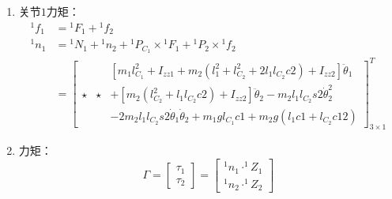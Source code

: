 \documentclass[
12pt, %
a4paper, 
oneside, %
headinclude,footinclude, %
]{scrartcl}
\begin{document}
{\begin{enumerate}
\begin{align*}
{}^1 n_2 &= {}^1 N_2 + {}^1 P_{C_2} \times {}^1 F_2 = \begin{bmatrix} 0 & 0 & (I_{zz2} + m_2l_{C_2}^2)(\ddot{\theta}_1 + \ddot{\theta}_2) + m_2 l_1 l_{C_2}c2 \ddot{\theta}_1 - m_2 l_1 l_{C_2}s2 \dot{\theta}_1^2 + m_2 g l_{C_2}c12 \end{bmatrix}^T
\end{align*}
\item 关节$ 1 $力矩：
\begin{align*}
{}^1 f_1 &= {}^1 F_1 + {}^1 f_2 \\
{}^1 n_1 &= {}^1 N_1 + {}^1 n_2 + {}^1 P_{C_1} \times {}^1 F_1 + {}^1 P_2 \times {}^1 f_2 \\
&= \begin{bmatrix} 
& & [m_1 l_{C_1}^2 + I_{zz1} + m_2(l_1^2 + l_{C_2}^2 + 2l_1 l_{C_2}c2) + I_{zz2}]\ddot{\theta}_1 \\
\star & \star & + [m_2(l_{C_2}^2 + l_1 l_{C_2}c2) + I_{zz2}]\ddot{\theta}_2 - m_2 l_1 l_{C_2}s2 \dot{\theta}_2^2 \\
& & - 2m_2 l_1 l_{C_2}s2 \dot{\theta}_1 \dot{\theta}_2 + m_1 g l_{C_1}c1 + m_2 g(l_1 c1 + l_{C_2}c12) 
\end{bmatrix}^T_{3 \times 1}
\end{align*}
\item 力矩：
$$ \Gamma = \begin{bmatrix} \tau_1 \\ \tau_2 \end{bmatrix} = \begin{bmatrix} ^1n_1 \cdot ^1Z_1 \\ ^1n_2 \cdot ^1Z_2 \end{bmatrix} $$
\end{enumerate}
}
\end{document}
